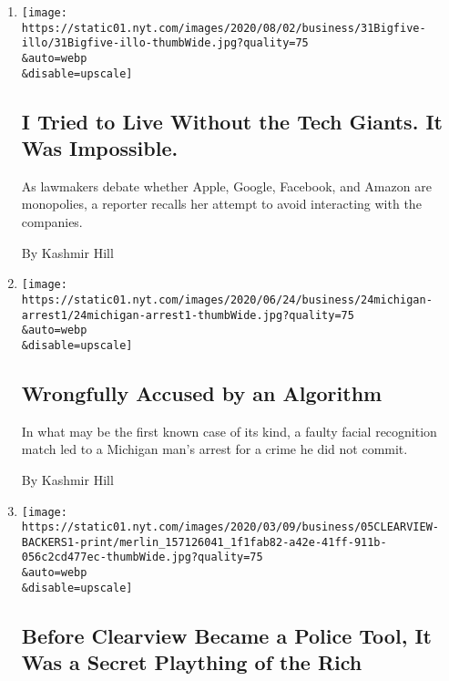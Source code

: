 \begin{enumerate}
\def\labelenumi{\arabic{enumi}.}
\item
  \href{/2020/07/31/technology/blocking-the-tech-giants.html}{}

  \texttt{[image: https://static01.nyt.com/images/2020/08/02/business/31Bigfive-illo/31Bigfive-illo-thumbWide.jpg?quality=75\\\&auto=webp\\\&disable=upscale]}

  \hypertarget{i-tried-to-live-without-the-tech-giants-it-was-impossible}{%
  \subsection{I Tried to Live Without the Tech Giants. It Was
  Impossible.}\label{i-tried-to-live-without-the-tech-giants-it-was-impossible}}

  As lawmakers debate whether Apple, Google, Facebook, and Amazon are
  monopolies, a reporter recalls her attempt to avoid interacting with
  the companies.

  By Kashmir Hill
\item
  \href{/2020/06/24/technology/facial-recognition-arrest.html}{}

  \texttt{[image: https://static01.nyt.com/images/2020/06/24/business/24michigan-arrest1/24michigan-arrest1-thumbWide.jpg?quality=75\\\&auto=webp\\\&disable=upscale]}

  \hypertarget{wrongfully-accused-by-an-algorithm}{%
  \subsection{Wrongfully Accused by an
  Algorithm}\label{wrongfully-accused-by-an-algorithm}}

  In what may be the first known case of its kind, a faulty facial
  recognition match led to a Michigan man's arrest for a crime he did
  not commit.

  By Kashmir Hill
\item
  \href{/2020/03/05/technology/clearview-investors.html}{}

  \texttt{[image: https://static01.nyt.com/images/2020/03/09/business/05CLEARVIEW-BACKERS1-print/merlin\_157126041\_1f1fab82-a42e-41ff-911b-056c2cd477ec-thumbWide.jpg?quality=75\\\&auto=webp\\\&disable=upscale]}

  \hypertarget{before-clearview-became-a-police-tool-it-was-a-secret-plaything-of-the-rich}{%
  \subsection{Before Clearview Became a Police Tool, It Was a Secret
  Plaything of the
  Rich}\label{before-clearview-became-a-police-tool-it-was-a-secret-plaything-of-the-rich}}


\end{enumerate}
